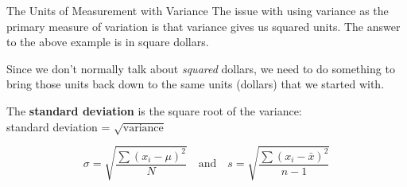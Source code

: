 \documentclass[t]{beamer}
\begin{document}
\begin{frame}{The Units of Measurement with Variance}
The issue with using variance as the primary measure of variation is that variance gives us squared units. The answer to the above example is in square dollars.	\newline\\	\pause

Since we don't normally talk about \emph{squared} dollars, we need to do something to bring those units back down to the same units (dollars) that we started with.	\newline\\	\pause

The {\color{blue}\textbf{standard deviation}} is the square root of the variance: \newline\\ standard deviation = $\sqrt{\text{variance}}$

\[\sigma = \sqrt{\frac{\sum (x_i-\mu)^2}{N}} \quad \text{and} \quad s = \sqrt{\frac{\sum (x_i-\bar{x})^2}{n-1}}\]
\end{frame}
\end{document}

